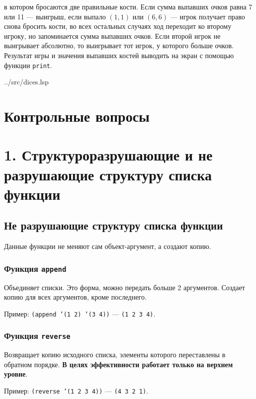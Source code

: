 в котором бросаются две правильные кости. Если сумма выпавших очков равна 7 или 11 --- выигрыш, если выпало $(1, 1)$ или $(6, 6)$ --- игрок получает право снова бросить кости, во всех остальных случаях ход переходит ко второму игроку, но запоминается сумма выпавших очков. Если второй игрок не выигрывает абсолютно, то выигрывает тот игрок, у которого больше очков. Результат игры и значения выпавших костей выводить на экран с помощью функции \texttt{print}.

\clearpage
\begin{lstinputlisting}[
	caption={Задание 5},
	label={lst:t5},
	style={lsp},
	linerange={1-47},
	]{../src/dices.lsp}
\end{lstinputlisting}

\section*{Контрольные вопросы}

\section*{1. Структуроразрушающие и не разрушающие структуру списка функции}

\subsection*{Не разрушающие структуру списка функции}

Данные функции не меняют сам объект-аргумент, а создают копию.

\subsubsection*{Функция \texttt{append}}

Объединяет списки. Это форма, можно передать больше 2 аргументов. Создает копию для всех аргументов, кроме последнего.

Пример: \texttt{(append '(1 2) '(3 4))} --- \texttt{(1 2 3 4)}.

\subsubsection*{Функция \texttt{reverse}}

Возвращает копию исходного списка, элементы которого переставлены в обратном порядке. \textbf{В целях эффективности работает только на верхнем уровне}.

Пример: \texttt{(reverse '(1 2 3 4))} --- \texttt{(4 3 2 1)}.

